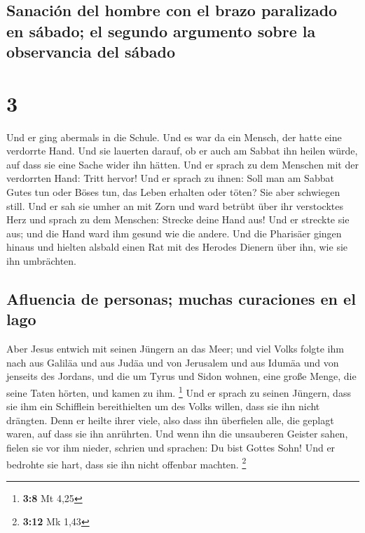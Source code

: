 \hypertarget{sanaciuxf3n-del-hombre-con-el-brazo-paralizado-en-suxe1bado-el-segundo-argumento-sobre-la-observancia-del-suxe1bado}{%
\subsection{Sanación del hombre con el brazo paralizado en sábado; el
segundo argumento sobre la observancia del
sábado}\label{sanaciuxf3n-del-hombre-con-el-brazo-paralizado-en-suxe1bado-el-segundo-argumento-sobre-la-observancia-del-suxe1bado}}

\hypertarget{section-2}{%
\section{3}\label{section-2}}

 Und er ging abermals in die Schule. Und es war da ein
Mensch, der hatte eine verdorrte Hand.  Und sie lauerten
darauf, ob er auch am Sabbat ihn heilen würde, auf dass sie eine Sache
wider ihn hätten.  Und er sprach zu dem Menschen mit der
verdorrten Hand: Tritt hervor!  Und er sprach zu ihnen:
Soll man am Sabbat Gutes tun oder Böses tun, das Leben erhalten oder
töten? Sie aber schwiegen still.  Und er sah sie umher an
mit Zorn und ward betrübt über ihr verstocktes Herz und sprach zu dem
Menschen: Strecke deine Hand aus! Und er streckte sie aus; und die Hand
ward ihm gesund wie die andere.  Und die Pharisäer gingen
hinaus und hielten alsbald einen Rat mit des Herodes Dienern über ihn,
wie sie ihn umbrächten.

\hypertarget{afluencia-de-personas-muchas-curaciones-en-el-lago}{%
\subsection{Afluencia de personas; muchas curaciones en el
lago}\label{afluencia-de-personas-muchas-curaciones-en-el-lago}}

 Aber Jesus entwich mit seinen Jüngern an das Meer; und
viel Volks folgte ihm nach aus Galiläa und aus Judäa  und
von Jerusalem und aus Idumäa und von jenseits des Jordans, und die um
Tyrus und Sidon wohnen, eine große Menge, die seine Taten hörten, und
kamen zu ihm. \footnote{\textbf{3:8} Mt 4,25}  Und er
sprach zu seinen Jüngern, dass sie ihm ein Schifflein bereithielten um
des Volks willen, dass sie ihn nicht drängten.  Denn er
heilte ihrer viele, also dass ihn überfielen alle, die geplagt waren,
auf dass sie ihn anrührten.  Und wenn ihn die unsauberen
Geister sahen, fielen sie vor ihm nieder, schrien und sprachen: Du bist
Gottes Sohn!  Und er bedrohte sie hart, dass sie ihn
nicht offenbar machten. \footnote{\textbf{3:12} Mk 1,43}

